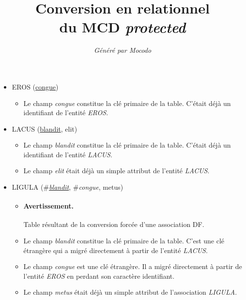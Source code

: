 \documentclass[a4paper]{article}
\title{Conversion en relationnel\\du MCD \emph{protected}}
\author{\emph{Généré par Mocodo}}
\newcommand{\relat}[1]{\textsc{#1}}
\newcommand{\attr}[1]{#1}
\newcommand{\prim}[1]{\uline{#1}}
\newcommand{\foreign}[1]{\#\textsl{#1}}
\begin{document}
\maketitle

\begin{itemize}
  \item \relat{EROS} (\prim{congue})
  \begin{itemize}
    \item Le champ \emph{congue} constitue la clé primaire de la table. C'était déjà un identifiant de l'entité \emph{EROS}.
  \end{itemize}

  \item \relat{LACUS} (\prim{blandit}, \attr{elit})
  \begin{itemize}
    \item Le champ \emph{blandit} constitue la clé primaire de la table. C'était déjà un identifiant de l'entité \emph{LACUS}.
    \item Le champ \emph{elit} était déjà un simple attribut de l'entité \emph{LACUS}.
  \end{itemize}

  \item \relat{LIGULA} (\foreign{\prim{blandit}}, \foreign{congue}, \attr{metus})
  \begin{itemize}
    \item \paragraph{Avertissement.} Table résultant de la conversion forcée d'une association DF.
    \item Le champ \emph{blandit} constitue la clé primaire de la table. C'est une clé étrangère qui a migré directement à partir de l'entité \emph{LACUS}.
    \item Le champ \emph{congue} est une clé étrangère. Il a migré directement à partir de l'entité \emph{EROS} en perdant son caractère identifiant.
    \item Le champ \emph{metus} était déjà un simple attribut de l'association \emph{LIGULA}.
  \end{itemize}

\end{itemize}
\end{document}
